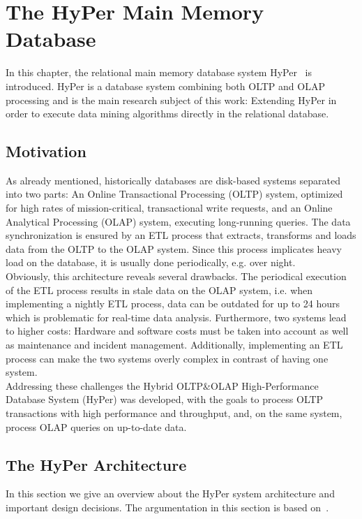 \chapter{The HyPer Main Memory Database}\label{chapter:hyper}
In this chapter, the relational main memory database system HyPer~\parencite{5767867} is introduced. HyPer is a database system combining both OLTP and OLAP processing and is the main research subject of this work: Extending HyPer in order to execute data mining algorithms directly in the relational database.

\section{Motivation}

As already mentioned, historically databases are disk-based systems separated into two parts: An Online Transactional Processing (OLTP) system, optimized for high rates of mission-critical, transactional write requests, and an Online Analytical Processing (OLAP) system, executing long-running queries. The data synchronization is ensured by an ETL process that extracts, transforms and loads data from the OLTP to the OLAP system. Since this process implicates heavy load on the database, it is usually done periodically, e.g. over night. 
\\
Obviously, this architecture reveals several drawbacks. The periodical execution of the ETL process results in stale data on the OLAP system, i.e. when implementing a nightly ETL process, data can be outdated for up to 24 hours which is problematic for real-time data analysis. Furthermore, two systems lead to higher costs: Hardware and software costs must be taken into account as well as maintenance and incident management. Additionally, implementing an ETL process can make the two systems overly complex in contrast of having one system.
\\
Addressing these challenges the Hybrid OLTP\&OLAP High-Performance Database System (HyPer) was developed, with the goals to process OLTP transactions with high performance and throughput, and, on the same system, process OLAP queries on up-to-date data. 

\section{The HyPer Architecture}
In this section we give an overview about the HyPer system architecture and important design decisions. The argumentation in this section is based on~\parencite{5767867}. 

